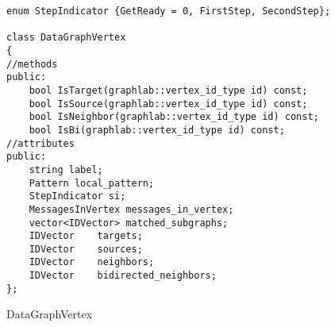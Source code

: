 \begin{Listing}[H]
\begin{lstlisting}
enum StepIndicator {GetReady = 0, FirstStep, SecondStep};

class DataGraphVertex
{
//methods
public:	
	bool IsTarget(graphlab::vertex_id_type id) const;
	bool IsSource(graphlab::vertex_id_type id) const;
	bool IsNeighbor(graphlab::vertex_id_type id) const;
	bool IsBi(graphlab::vertex_id_type id) const;
//attributes
public:
	string label;
	Pattern local_pattern;
	StepIndicator si;
	MessagesInVertex messages_in_vertex;
	vector<IDVector> matched_subgraphs;	
	IDVector	targets;
	IDVector 	sources;
	IDVector 	neighbors;
	IDVector	bidirected_neighbors;
};
\end{lstlisting}
\caption{DataGraphVertex}
\label{lst:DataGraphVertex}
\end{Listing}

